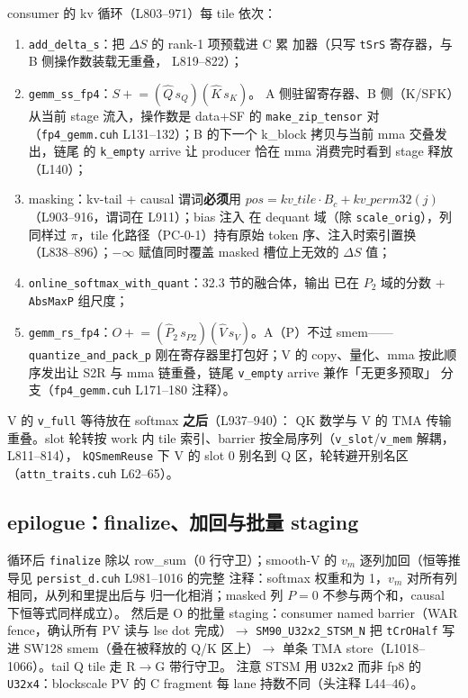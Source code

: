consumer 的 kv 循环（L803--971）每 tile 依次：
\begin{enumerate}[itemsep=0pt,topsep=2pt]
  \item \texttt{add\_delta\_s}：把 $\Delta S$ 的 rank-1 项预载进 C 累
        加器（只写 \texttt{tSrS} 寄存器，与 B 侧操作数装载无重叠，
        L819--822）；
  \item \texttt{gemm\_ss\_fp4}：$S\mathrel{+}= (\hat Q\,s_Q)(\hat K\,s_K)$。
        A 侧驻留寄存器、B 侧（K/SFK）从当前 stage 流入，操作数是
        data+SF 的 \texttt{make\_zip\_tensor} 对（\texttt{fp4\_gemm.cuh}
        L131--132）；B 的下一个 k\_block 拷贝与当前 mma 交叠发出，链尾
        的 \texttt{k\_empty} arrive 让 producer 恰在 mma 消费完时看到
        stage 释放（L140）；
  \item masking：kv-tail + causal 谓词\textbf{必须}用
        $pos=kv\_tile\cdot B_c+kv\_perm32(j)$（L903--916，谓词在
        L911）；bias 注入
        在 dequant 域（除 \texttt{scale\_orig}），列同样过 $\pi$，tile
        化路径（PC-0-1）持有原始 token 序、注入时索引置换
        （L838--896）；$-\infty$ 赋值同时覆盖 masked 槽位上无效的
        $\Delta S$ 值；
  \item \texttt{online\_softmax\_with\_quant}：32.3 节的融合体，输出
        已在 $P_2$ 域的分数 + \texttt{AbsMaxP} 组尺度；
  \item \texttt{gemm\_rs\_fp4}：$O\mathrel{+}= (\hat P_2\,s_{P2})
        (\hat V\,s_V)$。A（P）不过 smem——\texttt{quantize\_and\_pack\_p}
        刚在寄存器里打包好；V 的 copy、量化、mma 按此顺序发出让 S2R
        与 mma 链重叠，链尾 \texttt{v\_empty} arrive 兼作「无更多预取」
        分支（\texttt{fp4\_gemm.cuh} L171--180 注释）。
\end{enumerate}
V 的 \texttt{v\_full} 等待放在 softmax \textbf{之后}（L937--940）：
QK 数学与 V 的 TMA 传输重叠。slot 轮转按 work 内 tile 索引、barrier
按全局序列（\texttt{v\_slot}/\texttt{v\_mem} 解耦，L811--814），
\texttt{kQSmemReuse} 下 V 的 slot 0 别名到 Q 区，轮转避开别名区
（\texttt{attn\_traits.cuh} L62--65）。

\subsection{epilogue：finalize、加回与批量 staging}

循环后 \texttt{finalize} 除以 row\_sum（0 行守卫）；smooth-V 的
$v_m$ 逐列加回（恒等推导见 \texttt{persist\_d.cuh} L981--1016 的完整
注释：softmax 权重和为 1，$v_m$ 对所有列相同，从列和里提出后与
归一化相消；masked 列 $P=0$ 不参与两个和，causal 下恒等式同样成立）。
然后是 O 的批量 staging：consumer named barrier（WAR fence，确认所有
PV 读与 lse dot 完成）$\to$ \texttt{SM90\_U32x2\_STSM\_N} 把
\texttt{tCrOHalf} 写进 SW128 smem（叠在被释放的 Q/K 区上）$\to$
单条 TMA store（L1018--1066）。tail Q tile 走 R$\to$G 带行守卫。
注意 STSM 用 \texttt{U32x2} 而非 fp8 的 \texttt{U32x4}：blockscale
PV 的 C fragment 每 lane 持数不同（头注释 L44--46）。

